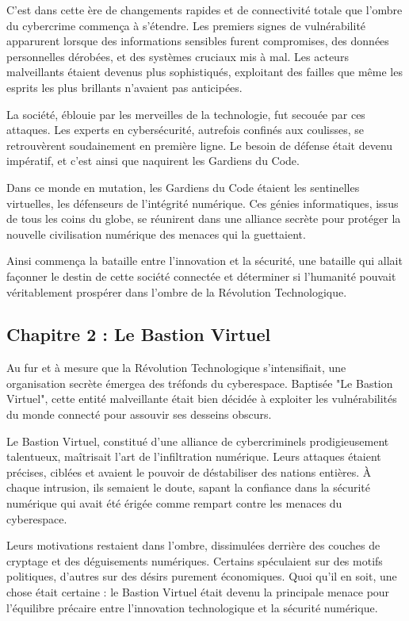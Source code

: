 \documentclass{./StyCls/MyArticle}
\begin{document}
C'est dans cette ère de changements rapides et de connectivité totale que l'ombre du cybercrime commença à s'étendre. Les premiers signes de vulnérabilité apparurent lorsque des informations sensibles furent compromises, des données personnelles dérobées, et des systèmes cruciaux mis à mal. Les acteurs malveillants étaient devenus plus sophistiqués, exploitant des failles que même les esprits les plus brillants n'avaient pas anticipées.

La société, éblouie par les merveilles de la technologie, fut secouée par ces attaques. Les experts en cybersécurité, autrefois confinés aux coulisses, se retrouvèrent soudainement en première ligne. Le besoin de défense était devenu impératif, et c'est ainsi que naquirent les Gardiens du Code.

Dans ce monde en mutation, les Gardiens du Code étaient les sentinelles virtuelles, les défenseurs de l'intégrité numérique. Ces génies informatiques, issus de tous les coins du globe, se réunirent dans une alliance secrète pour protéger la nouvelle civilisation numérique des menaces qui la guettaient.

Ainsi commença la bataille entre l'innovation et la sécurité, une bataille qui allait façonner le destin de cette société connectée et déterminer si l'humanité pouvait véritablement prospérer dans l'ombre de la Révolution Technologique.


\subsection{Chapitre 2 : Le Bastion Virtuel}

Au fur et à mesure que la Révolution Technologique s'intensifiait, une organisation secrète émergea des tréfonds du cyberespace. Baptisée "Le Bastion Virtuel", cette entité malveillante était bien décidée à exploiter les vulnérabilités du monde connecté pour assouvir ses desseins obscurs.

Le Bastion Virtuel, constitué d'une alliance de cybercriminels prodigieusement talentueux, maîtrisait l'art de l'infiltration numérique. Leurs attaques étaient précises, ciblées et avaient le pouvoir de déstabiliser des nations entières. À chaque intrusion, ils semaient le doute, sapant la confiance dans la sécurité numérique qui avait été érigée comme rempart contre les menaces du cyberespace.

Leurs motivations restaient dans l'ombre, dissimulées derrière des couches de cryptage et des déguisements numériques. Certains spéculaient sur des motifs politiques, d'autres sur des désirs purement économiques. Quoi qu'il en soit, une chose était certaine : le Bastion Virtuel était devenu la principale menace pour l'équilibre précaire entre l'innovation technologique et la sécurité numérique.
\end{document}
